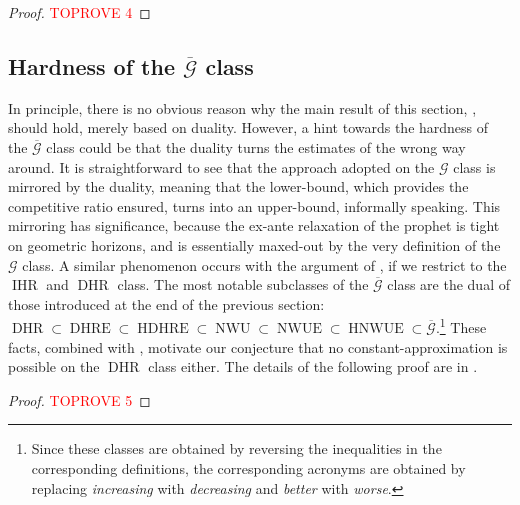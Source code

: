 \documentclass[11pt, a4paper, twoside]{article}
\newcommand{\PGF}{\mathcal{G}}
\newcommand{\PGFd}{\overline{\mathcal{G}}}
\DeclareMathOperator{\IHR}{IHR}
\DeclareMathOperator{\DHR}{DHR}
\DeclareMathOperator{\DHRE}{DHRE}
\DeclareMathOperator{\HDHRE}{HDHRE}
\DeclareMathOperator{\NWU}{NWU}
\DeclareMathOperator{\NWUE}{NWUE}
\DeclareMathOperator{\HNWUE}{HNWUE}
\numberwithin{equation}{section}
\begin{document}
    \begin{proof}\textcolor{red}{TOPROVE 4}\end{proof}
	
	\subsection{Hardness of the $\PGFd$ class}\label{Gdclass}
	In principle, there is no obvious reason why the main result of this section, , should hold, merely based on duality. However, a hint towards the hardness of the $\PGFd$ class could be that the duality turns the estimates of  the wrong way around. It is straightforward to see that the approach adopted on the $\PGF$ class is mirrored by the duality, meaning that the lower-bound, which provides the competitive ratio ensured, turns into an upper-bound, informally speaking. This mirroring has significance, because the ex-ante relaxation of the prophet is tight on geometric horizons, and is essentially maxed-out by the very definition of the $\PGF$ class. A similar phenomenon occurs with the argument of \cite{AliBanGolMunWan20}, if we restrict to the $\IHR$ and $\DHR$ class. The most notable subclasses of the $\PGFd$ class are the dual of those introduced at the end of the previous section: $\DHR\subset\DHRE\subset\HDHRE\subset\NWU\subset\NWUE\subset\HNWUE\subset\PGFd$.\footnote{Since these classes are obtained by reversing the inequalities in the corresponding definitions, the corresponding acronyms are obtained by replacing \textit{increasing} with \textit{decreasing} and \textit{better} with \textit{worse}.} These facts, combined with , motivate our conjecture that no constant-approximation is possible on the $\DHR$ class either. The details of the following proof are in .
	
	\begin{proof}\textcolor{red}{TOPROVE 5}\end{proof}
	
\end{document}
